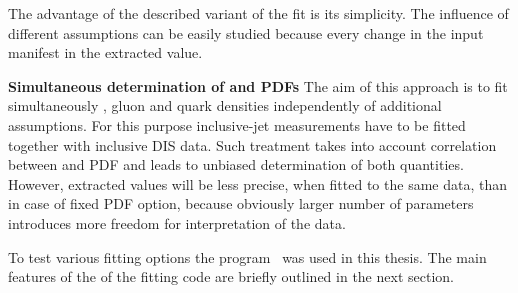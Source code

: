 The advantage of the described variant of the fit is its simplicity. The influence of different assumptions can be easily studied because every change in the input manifest in the extracted \asz value. 

{\flushleft \textbf{Simultaneous determination of \asz and PDFs}}\newline
The aim of this approach is to fit simultaneously \asz, gluon and quark densities independently of additional assumptions. For this purpose inclusive-jet measurements have to be fitted together with inclusive DIS data. Such treatment takes into account correlation between \as and PDF and leads to unbiased determination of both quantities. However, extracted values will be less precise, when fitted to the same data, than in case of fixed PDF option, because obviously larger number of parameters introduces more freedom for interpretation of the data.

To test various fitting options the \herafitter program~\cite{herafitter} was used in this thesis. The main features of the of the fitting code are briefly outlined in the next section. 